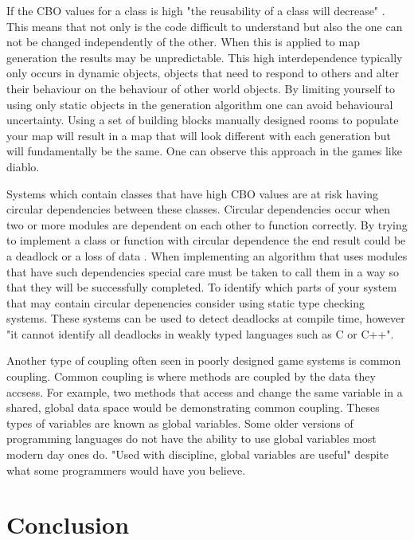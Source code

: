 \documentclass{scrartcl}
\begin{document}
If the CBO values for a class is high "the reusability of a class will decrease" \cite[p. 468]{rathore2011novel}. This means that not only is the code difficult to understand but also the one can not be changed independently of the other. When this is applied to map generation the results may be unpredictable. This high interdependence typically only occurs in dynamic objects, objects that need to respond to others and alter their behaviour on the behaviour of other world objects. By limiting yourself to using only static objects in the generation algorithm one can avoid behavioural uncertainty. Using a set of building blocks  manually designed rooms to populate your map will result in a map that will look different with each generation but will fundamentally be the same. One can observe this approach in the games like diablo\cite {togelius2013procedural}. 

Systems which contain classes that have high CBO values are at risk having circular dependencies between these classes. Circular dependencies occur when two or more modules are dependent on each other to function correctly\cite{nair2016solving}. By trying to implement a class or function with circular dependence the end result could be a deadlock or a loss of data \cite {nair2016solving}. When implementing an algorithm that uses modules that have such dependencies special care must be taken to call them in a way so that they will be successfully completed. To identify which parts of your system that may contain circular depenencies consider using static type checking systems\cite{boyapati2002ownership, naik2009effective}. These systems can be used to detect deadlocks at compile time, however "it cannot identify all deadlocks in weakly typed languages such as C or C++"\cite[p.76]{pyla2010avoiding}.

Another type of coupling often seen in poorly designed game systems is common coupling. Common coupling is where methods are coupled by the data they accsess\cite{briand1999unified}. For example, two methods that access and change the same variable in a shared, global data space would be demonstrating common coupling. Theses types of variables are known as global variables. Some older versions of programming languages do not have the ability to use global variables most modern day ones do. "Used with discipline, global variables are useful"\cite [p.338]{mcconnell2004code} despite what some programmers would have you believe\cite {wulf1973global}.
\section{Conclusion}





\end{document}
